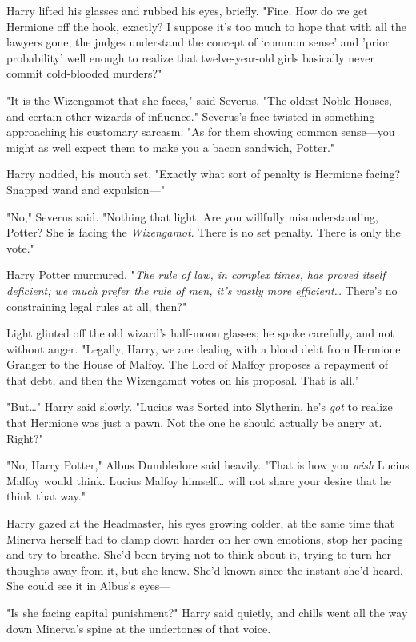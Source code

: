 Harry lifted his glasses and rubbed his eyes, briefly. "Fine. How do we get 
Hermione off the hook, exactly? I suppose it's too much to hope that with all 
the lawyers gone, the judges understand the concept of `common sense' and 
'prior probability' well enough to realize that twelve-year-old girls basically 
never commit cold-blooded murders?"

"It is the Wizengamot that she faces," said Severus. "The oldest Noble Houses, 
and certain other wizards of influence." Severus's face twisted in something 
approaching his customary sarcasm. "As for them showing common sense---you 
might as well expect them to make you a bacon sandwich, Potter."

Harry nodded, his mouth set. "Exactly what sort of penalty is Hermione facing? 
Snapped wand and expulsion---"

"No," Severus said. "Nothing that light. Are you willfully misunderstanding, 
Potter? She is facing the \emph{Wizengamot}. There is no set penalty. There is 
only the vote."

Harry Potter murmured, "\emph{The rule of law, in complex times, has proved 
itself deficient; we much prefer the rule of men, it's vastly more 
efficient{\ldots}} There's no constraining legal rules at all, then?"

Light glinted off the old wizard's half-moon glasses; he spoke carefully, and 
not without anger. "Legally, Harry, we are dealing with a blood debt from 
Hermione Granger to the House of Malfoy. The Lord of Malfoy proposes a 
repayment of that debt, and then the Wizengamot votes on his proposal. That is 
all."

"But{\ldots}" Harry said slowly. "Lucius was Sorted into Slytherin, he's 
\emph{got} to realize that Hermione was just a pawn. Not the one he should 
actually be angry at. Right?"

"No, Harry Potter," Albus Dumbledore said heavily. "That is how you \emph{wish} 
Lucius Malfoy would think. Lucius Malfoy himself{\ldots} will not share your 
desire that he think that way."

Harry gazed at the Headmaster, his eyes growing colder, at the same time that 
Minerva herself had to clamp down harder on her own emotions, stop her pacing 
and try to breathe. She'd been trying not to think about it, trying to turn her 
thoughts away from it, but she knew. She'd known since the instant she'd heard. 
She could see it in Albus's eyes---

"Is she facing capital punishment?" Harry said quietly, and chills went all the 
way down Minerva's spine at the undertones of that voice.

